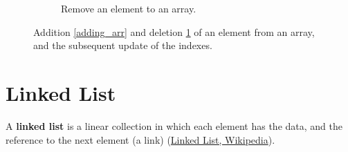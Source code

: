 \begin{figure}[H]
\begin{subfigure}[b]{\linewidth}
\caption{Remove an element to an array.}
\label{removing_arr}
\end{subfigure}
\caption[Addition \ref{adding_arr} and deletion \ref{removing_arr} of an element from an array, and the subsequent update of the indexes.]{Addition \ref{adding_arr} and deletion \ref{removing_arr} of an element from an array, and the subsequent update of the indexes.}
\label{array_2}
\end{figure}

\section{Linked List}
\label{linkedlist}
A \textbf{linked list} is a linear collection in which each element has the data, and the reference to the next element (a link) \cite{wikilinkedlist} (\href{https://en.wikipedia.org/wiki/Linked_list}{Linked List, Wikipedia}). 


